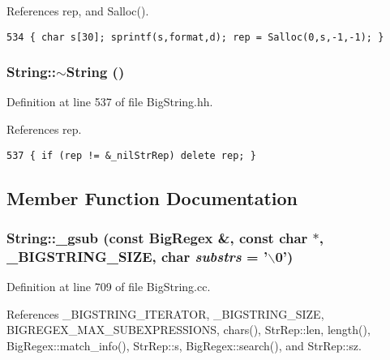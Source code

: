 References rep, and Salloc().



\footnotesize\begin{verbatim}534 { char s[30]; sprintf(s,format,d); rep = Salloc(0,s,-1,-1); }
\end{verbatim}\normalsize 
{}
\subsubsection{\setlength{\rightskip}{0pt plus 5cm}String::$\sim$String ()\hspace{0.3cm}{\tt  [inline]}}\label{classString_a9}




Definition at line 537 of file Big\-String.hh.

References rep.



\footnotesize\begin{verbatim}537 { if (rep != &_nilStrRep) delete rep; }
\end{verbatim}\normalsize 


\subsection{Member Function Documentation}
\subsubsection{ String::\_\-gsub (const {\bf Big\-Regex} \&, const char $\ast$, {\bf \_\-BIGSTRING\_\-SIZE}, char {\em substrs} = '$\backslash$0')\hspace{0.3cm}{\tt  [protected]}}\label{classString_b4}




Definition at line 709 of file Big\-String.cc.

References \_\-BIGSTRING\_\-ITERATOR, \_\-BIGSTRING\_\-SIZE, BIGREGEX\_\-MAX\_\-SUBEXPRESSIONS, chars(), Str\-Rep::len, length(), Big\-Regex::match\_\-info(), Str\-Rep::s, Big\-Regex::search(), and Str\-Rep::sz.



